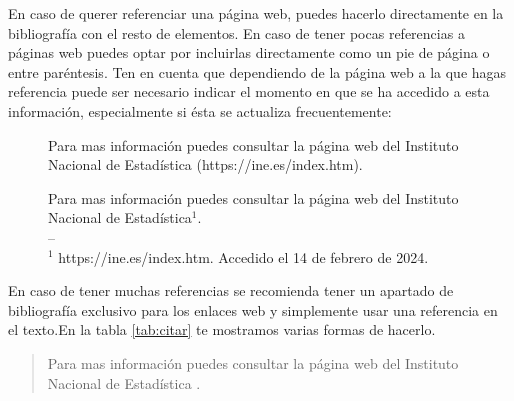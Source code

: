 En caso de querer referenciar una página web, puedes hacerlo directamente en la bibliografía con el resto de elementos. En caso de tener pocas referencias a páginas web puedes optar por incluirlas directamente como un pie de página o entre paréntesis. Ten en cuenta que dependiendo de la página web a la que hagas referencia puede ser necesario indicar el momento en que se ha accedido a esta información, especialmente si ésta se actualiza frecuentemente:

\begin{figure}[!ht]
    \begin{minipage}{.45\textwidth}
        \begin{it}
        Para mas información puedes consultar la página web del Instituto Nacional de Estadística (https://ine.es/index.htm).
        \end{it}
    \end{minipage}
    \hfill
    \begin{minipage}{.45\textwidth}
        \begin{it}
        Para mas información puedes consultar la página web del Instituto Nacional de Estadística$^1$.\\
        --\\
        $^1$ https://ine.es/index.htm. Accedido el 14 de febrero de 2024.
        \end{it}
    \end{minipage}
\end{figure}

En caso de tener muchas referencias se recomienda tener un apartado de bibliografía exclusivo para los enlaces web y simplemente usar una referencia en el texto.En la tabla \ref{tab:citar} te mostramos varias formas de hacerlo.

\begin{quote}
\begin{it}
    Para mas información puedes consultar la página web del Instituto Nacional de Estadística \cite{INE}.
\end{it}
\end{quote}

